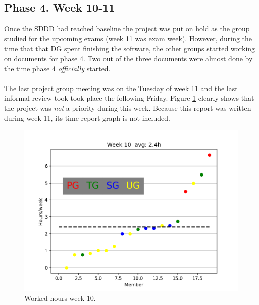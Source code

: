 \documentclass{article}
\begin{document}
    \subsection{Phase 4. Week 10-11 \label{phase4}}
        Once the SDDD had reached baseline the project was put on hold as the group
        studied for the upcoming exams (week 11 was exam week). However, during the time that
        that DG spent finishing the software, the other groups started working on documents for phase 4.
        Two out of the three documents were almost done by the time phase 4 \emph{officially} started.
        \\ \\
        The last project group meeting was on the Tuesday of week 11 and the last informal review took
        took place the following Friday. Figure \ref{fig:week10} clearly shows that the project was \emph{not}
        a priority during this week. Because this report was written during week 11, its time report graph is not included.
        \begin{figure}[!htb]
            \centering
              \includegraphics[width=\linewidth]{images/week_10.png}
              \caption{Worked hours week 10.}\label{fig:week10}
            \endminipage\hfill
        \end{figure}
\end{document}
